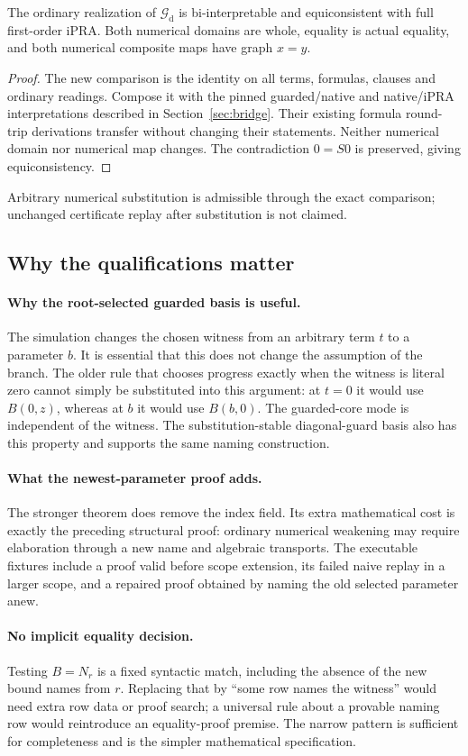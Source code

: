\begin{corollary}
The ordinary realization of $\mathcal G_{\mathrm d}$ is bi-interpretable
and equiconsistent with full first-order iPRA. Both numerical domains are
whole, equality is actual equality, and both numerical composite maps have
graph $x=y$.
\end{corollary}
\begin{proof}
The new comparison is the identity on all terms, formulas, clauses and
ordinary readings. Compose it with the pinned guarded/native and native/iPRA
interpretations described in Section~\ref{sec:bridge}. Their existing formula
round-trip derivations transfer without changing their statements. Neither
numerical domain nor numerical map changes. The contradiction $0=S0$ is
preserved, giving equiconsistency.
\end{proof}
Arbitrary numerical substitution is admissible through the exact comparison;
unchanged certificate replay after substitution is not claimed.

\subsection{Why the qualifications matter}

\paragraph{Why the root-selected guarded basis is useful.}
The simulation changes the chosen witness from an arbitrary term $t$ to a
parameter $b$. It is essential that this does not change the assumption of
the branch. The older rule that chooses progress exactly when the witness
is literal zero cannot simply be substituted into this argument: at $t=0$
it would use $B(0,z)$, whereas at $b$ it would use $B(b,0)$. The guarded-core
mode is independent of the witness. The substitution-stable diagonal-guard
basis also has this property and supports the same naming construction.

\paragraph{What the newest-parameter proof adds.}
The stronger theorem does remove the index field. Its extra mathematical
cost is exactly the preceding structural proof: ordinary numerical weakening
may require elaboration through a new name and algebraic transports. The
executable fixtures include a proof valid before scope extension, its failed
naive replay in a larger scope, and a repaired proof obtained by naming the
old selected parameter anew.

\paragraph{No implicit equality decision.}
Testing $B=N_r$ is a fixed syntactic match, including the absence of the new
bound names from $r$. Replacing that by ``some row names the witness'' would
need extra row data or proof search; a universal rule about a provable naming
row would reintroduce an equality-proof premise. The narrow pattern is
sufficient for completeness and is the simpler mathematical specification.

